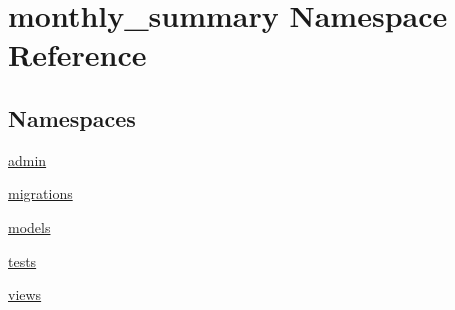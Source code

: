 \hypertarget{namespacemonthly__summary}{\section{monthly\-\_\-summary Namespace Reference}
\label{namespacemonthly__summary}
}
\subsection*{Namespaces}
\begin{DoxyCompactItemize}
\item 
\hyperlink{namespacemonthly__summary_1_1admin}{admin}
\item 
\hyperlink{namespacemonthly__summary_1_1migrations}{migrations}
\item 
\hyperlink{namespacemonthly__summary_1_1models}{models}
\item 
\hyperlink{namespacemonthly__summary_1_1tests}{tests}
\item 
\hyperlink{namespacemonthly__summary_1_1views}{views}
\end{DoxyCompactItemize}
